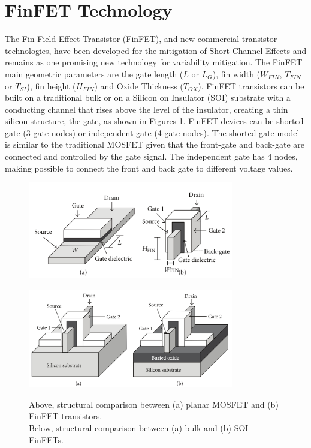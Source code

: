 \documentclass[diss,pgmicro,english]{iiufrgs}
\begin{document}
\section{FinFET Technology}

The Fin Field Effect Transistor (FinFET), and new commercial transistor technologies, have been developed for the mitigation of Short-Channel Effects and remains as one promising new technology for variability mitigation. The FinFET main geometric parameters are the gate length ($L$ or $L_G$), fin width ($W_{FIN}$, $T_{FIN}$ or $T_{SI}$), fin height ($H_{FIN}$) and Oxide Thickness ($T_{OX}$). FinFET transistors can be built on a traditional bulk or on a Silicon on Insulator (SOI) substrate with a conducting channel that rises above the level of the insulator, creating a thin silicon structure, the gate, as shown in Figures \ref{finfet}. FinFET devices can be shorted-gate (3 gate nodes) or independent-gate (4 gate nodes). The shorted gate model is similar to the traditional MOSFET given that the front-gate and back-gate are connected and controlled by the gate signal. The independent gate has 4 nodes, making possible to connect the front and back gate to different voltage values.

    \begin{figure} [t]
        \centering
	\includegraphics[width=0.8\textwidth, trim={0 0 0 0},clip]{finfet.pdf}
        \caption{Above, structural comparison between (a) planar MOSFET and (b) FinFET transistors. \\
		Below, structural comparison between (a) bulk and (b) SOI FinFETs.}

        \centering
        \includegraphics[width=0.8\textwidth, trim={0 0 0 0},clip]{finfet2.png}
        \label{finfet}
    \end{figure}
\end{document}
